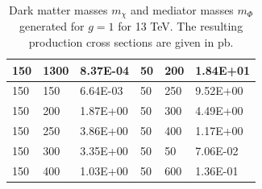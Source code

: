 \begin{table}[h]
\begin{tabular}{lll|lll}
		150 & 1300 & 8.37E-04 & 50  & 200  & 1.84E+01 \\\hline
		150 & 150  & 6.64E-03 & 50  & 250  & 9.52E+00 \\\hline
		150 & 200  & 1.87E+00 & 50  & 300  & 4.49E+00 \\\hline
		150 & 250  & 3.86E+00 & 50  & 400  & 1.17E+00 \\\hline
		150 & 300  & 3.35E+00 & 50  & 50   & 7.06E-02 \\\hline
		150 & 400  & 1.03E+00 & 50  & 600  & 1.36E-01 \\\hline
		\hline
	\end{tabular}
	\caption{Dark matter masses $m_{\chi}$ and mediator masses $m_{\Phi}$ generated for $g=1$ for 13 TeV. The resulting
		production cross sections are given in pb.\label{tab:g1_13T}}
\end{table}


